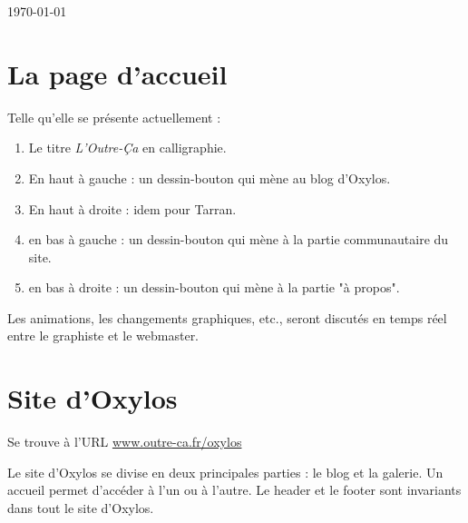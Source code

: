 \documentclass[french]{report}
\theoremstyle{plain}
\begin{document}
\begin{titlepage}
\begin{center}
	{\large   \today }






	\vfill



	\end{center}

	\end{titlepage}





	\pagebreak{}






	\tableofcontents





	\pagebreak



\chapter{La page d'accueil}

	Telle qu'elle se présente actuellement : 
	\begin{enumerate}
		\item Le titre \emph{L'Outre-Ça} en calligraphie.
		\item En haut à gauche : un dessin-bouton qui mène au blog d'Oxylos.
		\item En haut à droite : idem pour Tarran.
		\item en bas à gauche : un dessin-bouton qui mène à la partie communautaire du site.
		\item en bas à droite : un dessin-bouton qui mène à la partie "à propos". 
	\end{enumerate}
	Les animations, les changements graphiques, etc., seront discutés en temps réel entre le graphiste et le webmaster.


\chapter{Site d'Oxylos}
	
	Se trouve à l'URL \url{www.outre-ca.fr/oxylos}

	Le site d'Oxylos se divise en deux principales parties : le blog et la galerie. Un accueil permet d'accéder à l'un ou à l'autre. Le header et le footer sont invariants dans tout le site d'Oxylos.
\end{document}
